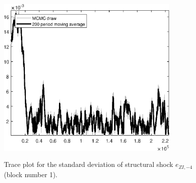 \begin{figure}[H]
\centering
  \includegraphics[width=0.8\textwidth]{BRS_sectoral/graphs/TracePlot_SE_e_ZI_news_blck_1}\\
    \caption{Trace plot for the standard deviation of structural shock ${e_{ZI,-4}}$ (block number 1).}
\end{figure}

